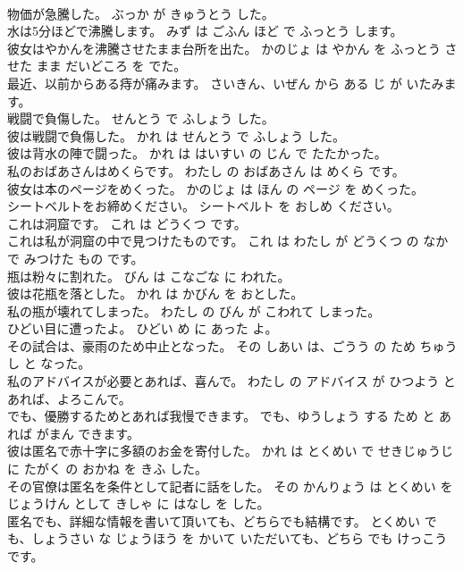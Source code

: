 \documentclass[8pt]{extreport}
\begin{document}
\begin{CJK}{UTF8}{min}
\\	物価が急騰した。	ぶっか が きゅうとう した。	
\\	水は5分ほどで沸騰します。	みず は ごふん ほど で ふっとう します。	
\\	彼女はやかんを沸騰させたまま台所を出た。	かのじょ は やかん を ふっとう させた まま だいどころ を でた。	
\\	最近、以前からある痔が痛みます。	さいきん、いぜん から ある じ が いたみます。	
\\	戦闘で負傷した。	せんとう で ふしょう した。	
\\	彼は戦闘で負傷した。	かれ は せんとう で ふしょう した。	
\\	彼は背水の陣で闘った。	かれ は はいすい の じん で たたかった。	
\\	私のおばあさんはめくらです。	わたし の おばあさん は めくら です。	
\\	彼女は本のページをめくった。	かのじょ は ほん の ページ を めくった。	
\\	シートベルトをお締めください。	シートベルト を おしめ ください。	
\\	これは洞窟です。	これ は どうくつ です。	
\\	これは私が洞窟の中で見つけたものです。	これ は わたし が どうくつ の なか で みつけた もの です。	
\\	瓶は粉々に割れた。	びん は こなごな に われた。	
\\	彼は花瓶を落とした。	かれ は かびん を おとした。	
\\	私の瓶が壊れてしまった。	わたし の びん が こわれて しまった。	
\\	ひどい目に遭ったよ。	ひどい め に あった よ。	
\\	その試合は、豪雨のため中止となった。	その しあい は、ごうう の ため ちゅうし と なった。	
\\	私のアドバイスが必要とあれば、喜んで。	わたし の アドバイス が ひつよう と あれば、よろこんで。	
\\	でも、優勝するためとあれば我慢できます。	でも、ゆうしょう する ため と あれば がまん できます。	
\\	彼は匿名で赤十字に多額のお金を寄付した。	かれ は とくめい で せきじゅうじ に たがく の おかね を きふ した。	
\\	その官僚は匿名を条件として記者に話をした。	その かんりょう は とくめい を じょうけん として きしゃ に はなし を した。	
\\	匿名でも、詳細な情報を書いて頂いても、どちらでも結構です。	とくめい でも、しょうさい な じょうほう を かいて いただいても、どちら でも けっこう です。	

\end{CJK}
\end{document}
